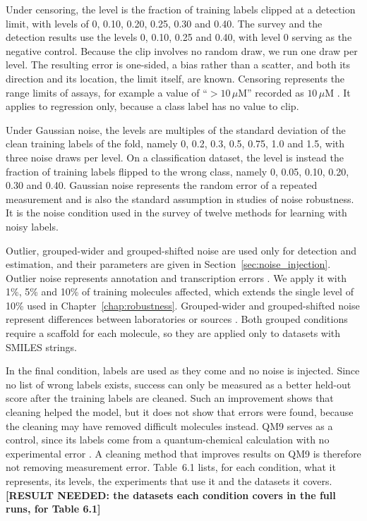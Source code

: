Under censoring, the level is the fraction of training labels clipped at a detection limit, with levels of 0, 0.10, 0.20, 0.25, 0.30 and 0.40. The survey and the detection results use the levels 0, 0.10, 0.25 and 0.40, with level 0 serving as the negative control. Because the clip involves no random draw, we run one draw per level. The resulting error is one-sided, a bias rather than a scatter, and both its direction and its location, the limit itself, are known. Censoring represents the range limits of assays, for example a value of ``$>10\,\mu$M'' recorded as $10\,\mu$M \citep{Svensson2025}. It applies to regression only, because a class label has no value to clip.

Under Gaussian noise, the levels are multiples of the standard deviation of the clean training labels of the fold, namely 0, 0.2, 0.3, 0.5, 0.75, 1.0 and 1.5, with three noise draws per level. On a classification dataset, the level is instead the fraction of training labels flipped to the wrong class, namely 0, 0.05, 0.10, 0.20, 0.30 and 0.40. Gaussian noise represents the random error of a repeated measurement and is also the standard assumption in studies of noise robustness. It is the noise condition used in the survey of twelve methods for learning with noisy labels.

Outlier, grouped-wider and grouped-shifted noise are used only for detection and estimation, and their parameters are given in Section~\ref{sec:noise_injection}. Outlier noise represents annotation and transcription errors \citep{Kalliokoski2013, Hampel2001}. We apply it with 1\%, 5\% and 10\% of training molecules affected, which extends the single level of 10\% used in Chapter~\ref{chap:robustness}. Grouped-wider and grouped-shifted noise represent differences between laboratories or sources \citep{Bentz2013}. Both grouped conditions require a scaffold for each molecule, so they are applied only to datasets with SMILES strings.

In the final condition, labels are used as they come and no noise is injected. Since no list of wrong labels exists, success can only be measured as a better held-out score after the training labels are cleaned. Such an improvement shows that cleaning helped the model, but it does not show that errors were found, because the cleaning may have removed difficult molecules instead. QM9 serves as a control, since its labels come from a quantum-chemical calculation with no experimental error \citep{Ramakrishnan2014}. A cleaning method that improves results on QM9 is therefore not removing measurement error. Table~6.1 lists, for each condition, what it represents, its levels, the experiments that use it and the datasets it covers. \textbf{[RESULT NEEDED: the datasets each condition covers in the full runs, for Table 6.1]}

